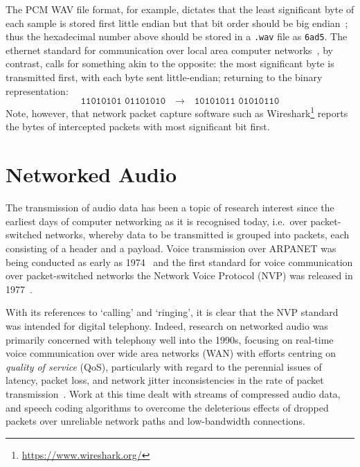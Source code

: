 The PCM WAV file format, for example, dictates that the least significant byte
of each sample is stored first \textemdash{} little endian \textemdash{} but
that bit order should be big endian~\citep{noauthor_multimedia_1991};
thus the hexadecimal number above should be stored in a \texttt{.wav} file as
\texttt{6ad5}.
The ethernet standard for communication over local area computer
networks~\citep{noauthor_ieee_2018}, by contrast, calls for something akin to
the opposite:
the most significant byte is transmitted first, with each byte sent
little-endian;
returning to the binary representation:
\begin{equation*}
    \texttt{11010101 01101010} \quad\rightarrow\quad \texttt{10101011 01010110}
\end{equation*}
Note, however, that network packet capture software such as
Wireshark\footnote{\url{https://www.wireshark.org/}} reports the bytes of
intercepted packets with most significant bit first.


\section{Networked Audio}\label{sec:networked-audio}

The transmission of audio data has been a topic of research interest since the
earliest days of computer networking as it is recognised today, i.e.\ over
packet-switched networks, whereby data to be transmitted is grouped into
packets, each consisting of a header and a payload.
Voice transmission over ARPANET was being conducted as early as
1974~\citep{schulzrinne_voice_1992} and the first standard for voice
communication over packet-switched networks \textemdash{} the Network Voice
Protocol (NVP) \textemdash{} was released in
1977~\citep{cohen_specifications_1977}.

With its references to `calling' and `ringing', it is clear that the NVP
standard was intended for digital telephony.
Indeed, research on networked audio was primarily concerned with telephony well
into the 1990s, focusing on real-time voice communication over wide area
networks (WAN) with efforts centring on \textit{quality of service} (QoS),
particularly with regard to the perennial issues of latency, packet loss, and
network jitter \textemdash{} inconsistencies in the rate of packet
transmission~\citep{hardman_reliable_1995,hardman_successful_1998}.
Work at this time dealt with streams of compressed audio data, and speech
coding algorithms to overcome the deleterious effects of dropped packets over
unreliable network paths and low-bandwidth connections.

